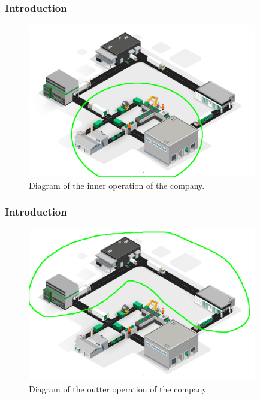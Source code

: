 \documentclass[t,compress,11pt,xcolor=dvipsnames,pdf,english]{beamer}
\begin{document}
\begin{frame}[c]{ }
\frametitle{Introduction}
\begin{figure}
    \includegraphics[width=10cm]{img/map_inner.png}
    \centering
    \caption{Diagram of the inner operation of the company.}
\end{figure}
\end{frame}

\begin{frame}[c]{ }
\frametitle{Introduction}
\begin{figure}
    \includegraphics[width=10cm]{img/map_outter.png}
    \centering
    \caption{Diagram of the outter operation of the company.}
\end{figure}
\end{frame}


\end{document}
